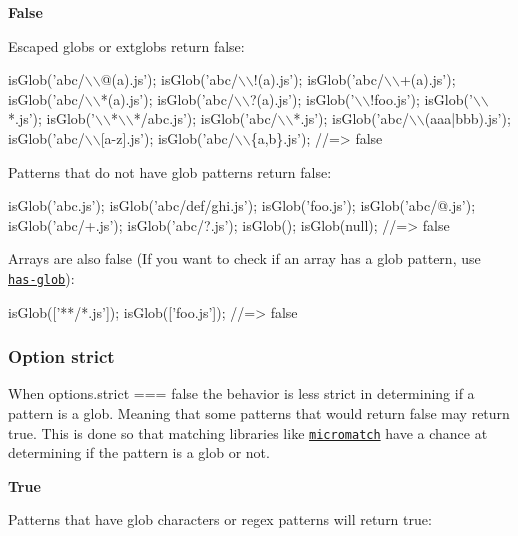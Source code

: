 {\bfseries False}

Escaped globs or extglobs return {\ttfamily false}\+:


\begin{DoxyCode}
isGlob('abc/\(\backslash\)\(\backslash\)@(a).js');
isGlob('abc/\(\backslash\)\(\backslash\)!(a).js');
isGlob('abc/\(\backslash\)\(\backslash\)+(a).js');
isGlob('abc/\(\backslash\)\(\backslash\)*(a).js');
isGlob('abc/\(\backslash\)\(\backslash\)?(a).js');
isGlob('\(\backslash\)\(\backslash\)!foo.js');
isGlob('\(\backslash\)\(\backslash\)*.js');
isGlob('\(\backslash\)\(\backslash\)*\(\backslash\)\(\backslash\)*/abc.js');
isGlob('abc/\(\backslash\)\(\backslash\)*.js');
isGlob('abc/\(\backslash\)\(\backslash\)(aaa|bbb).js');
isGlob('abc/\(\backslash\)\(\backslash\)[a-z].js');
isGlob('abc/\(\backslash\)\(\backslash\)\{a,b\}.js');
//=> false
\end{DoxyCode}


Patterns that do not have glob patterns return {\ttfamily false}\+:


\begin{DoxyCode}
isGlob('abc.js');
isGlob('abc/def/ghi.js');
isGlob('foo.js');
isGlob('abc/@.js');
isGlob('abc/+.js');
isGlob('abc/?.js');
isGlob();
isGlob(null);
//=> false
\end{DoxyCode}


Arrays are also {\ttfamily false} (If you want to check if an array has a glob pattern, use \href{https://github.com/jonschlinkert/has-glob}{\tt has-\/glob})\+:


\begin{DoxyCode}
isGlob(['**/*.js']);
isGlob(['foo.js']);
//=> false
\end{DoxyCode}


\subsubsection*{Option strict}

When {\ttfamily options.\+strict === false} the behavior is less strict in determining if a pattern is a glob. Meaning that some patterns that would return {\ttfamily false} may return {\ttfamily true}. This is done so that matching libraries like \href{https://github.com/micromatch/micromatch}{\tt micromatch} have a chance at determining if the pattern is a glob or not.

{\bfseries True}

Patterns that have glob characters or regex patterns will return {\ttfamily true}\+:


